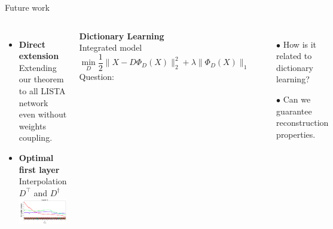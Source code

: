 \documentclass{beamer}
\begin{document}
\begin{frame}[c]{Future work}
\begin{columns}[T]
\begin{itemize}
    \item {\bf Direct extension }\\[.5em]
    Extending our theorem to all LISTA network even without weights coupling.\\[1em]

    \item {\bf Optimal first layer}\\[.5em]
        Interpolation $D^\top$ and $D^\dagger$\\[1em]
    {\centering
    \includegraphics[width=.8\linewidth]{first_layer}\\[1em]}
\end{itemize}

    \myitem \parbox[t]{.9\linewidth}{\raggedright
        {\bf Dictionary Learning}\\[.5em]
        Integrated model
        {\footnotesize\[
            \min_D \frac{1}{2}\|X - D\Phi_D(X)\|_2^2 + \lambda\|\Phi_D(X)\|_1
        \]}%
        Question:
        
\begin{itemize}
    \item[$\bullet$] How is it related to dictionary learning?
    \item[$\bullet$] Can we guarantee reconstruction properties.
\end{itemize}
        }
\end{columns}
\end{frame}
\end{document}
